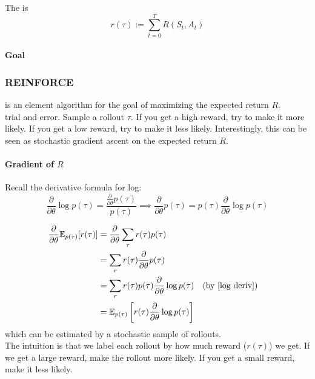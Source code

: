 \documentclass[11pt]{article}
\begin{document}
The  is 
$$r(\tau) := \sum_{t=0}^T R(S_t,A_t)$$

\paragraph{Goal}
\subsubsection{REINFORCE}
 is an element algorithm for the goal of maximizing the expected return $R$.\\
 trial and error. Sample a rollout $\tau$. If you get a high reward, try to make it more likely. If you get a low reward, try to make it less likely. Interestingly, this can be seen as stochastic gradient ascent on the expected return $R$.
\paragraph{Gradient of $R$}
Recall the derivative formula for log:
\begin{equation}
	\frac{\partial}{\partial \theta}\log p(\tau) = \frac{\frac{\partial}{\partial \theta}p(\tau)}{p(\tau)} \implies \frac{\partial}{\partial \theta}p(\tau) = p(\tau)\frac{\partial}{\partial \theta}\log p(\tau) \label{log deriv}
\end{equation}

\begin{align}
	\frac{\partial}{\partial \theta} \mathbb{E}_{p(\tau)}[r(\tau)] &= \frac{\partial}{\partial \theta} \sum_{\tau} r(\tau)p(\tau) \\
	&= \sum_{r}r(\tau) \frac{\partial}{\partial \theta}p(\tau)\\
	&= \sum_{r}r(\tau)p(\tau)\frac{\partial}{\partial \theta}\log p(\tau) &&\text{(by \ref{log deriv}})\\
	&= \mathbb{E}_{p(\tau)}\left[ r(\tau)\frac{\partial}{\partial \theta} \log p(\tau) \right]\\
\end{align}
which can be estimated by a stochastic sample of rollouts. \\

\noindent The intuition is that we label each rollout by how much reward ($r(\tau)$) we get. If we get a large reward, make the rollout more likely. If you get a small reward, make it less likely.
\end{document}
